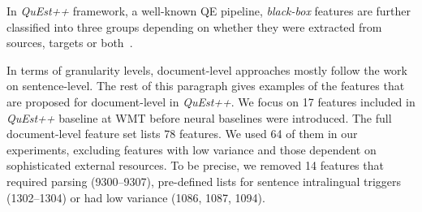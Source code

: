 In \textit{QuEst++} framework, a well-known QE pipeline, \textit{black-box} features are further classified into three groups depending on whether they were extracted from sources, targets or both~\cite{Specia2018a}. 

In terms of granularity levels, document-level approaches mostly follow the work on sentence-level. 
The rest of this paragraph gives examples of the features that are proposed for document-level in \textit{QuEst++}.
We focus on 17 features included in \textit{QuEst++} baseline at WMT before neural baselines were introduced. The full document-level feature set lists 78 features. We used 64 of them in our experiments, excluding features with low variance and those dependent on sophisticated external resources. To be precise, we removed 14 features that required parsing (9300--9307), pre-defined lists for sentence intralingual triggers (1302--1304) or had low variance (1086, 1087, 1094).

